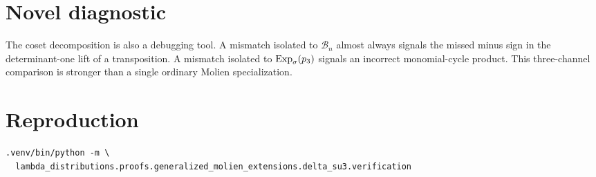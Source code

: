 \documentclass[11pt]{article}
\begin{document}
\section{Novel diagnostic}
The coset decomposition is also a debugging tool.  A mismatch isolated to $\mathcal B_n$ almost always signals the missed minus sign in the determinant-one lift of a transposition.  A mismatch isolated to $\operatorname{Exp}_{\sigma}(p_3)$ signals an incorrect monomial-cycle product.  This three-channel comparison is stronger than a single ordinary Molien specialization.

\section*{Reproduction}
\begin{verbatim}
.venv/bin/python -m \
  lambda_distributions.proofs.generalized_molien_extensions.delta_su3.verification
\end{verbatim}
\end{document}
